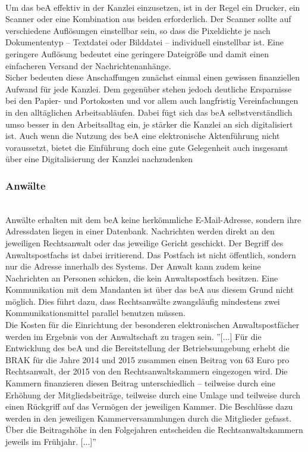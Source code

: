 \\
Um das beA effektiv in der Kanzlei einzusetzen, ist in der Regel ein Drucker, ein Scanner oder eine Kombination aus beiden erforderlich. Der Scanner sollte auf verschiedene Auflösungen einstellbar sein, so dass die Pixeldichte je nach Dokumententyp – Textdatei oder Bilddatei – individuell einstellbar ist. Eine geringere Auflösung bedeutet eine geringere Dateigröße und damit einen einfacheren Versand der Nachrichtenanhänge. \\
Sicher bedeuten diese Anschaffungen zunächst einmal einen gewissen finanziellen Aufwand für jede Kanzlei. Dem gegenüber stehen jedoch deutliche Ersparnisse bei den Papier- und Portokosten und vor allem auch langfristig Vereinfachungen in den alltäglichen Arbeitsabläufen. Dabei fügt sich das beA selbstverständlich umso besser in den Arbeitsalltag ein, je stärker die Kanzlei an sich digitalisiert ist. Auch wenn die Nutzung des beA eine elektronische Aktenführung nicht voraussetzt, bietet die Einführung doch eine gute Gelegenheit auch insgesamt über eine Digitalisierung der Kanzlei nachzudenken

\subsubsection{Anwälte}\hspace*{\fill} \\
Anwälte erhalten mit dem beA keine herkömmliche E-Mail-Adresse, sondern ihre Adressdaten liegen in einer Datenbank. Nachrichten werden direkt an den jeweiligen Rechtsanwalt oder das jeweilige Gericht geschickt.
Der Begriff des Anwaltspostfachs ist dabei irritierend. Das Postfach ist nicht öffentlich, sondern nur die Adresse innerhalb des Systems. Der Anwalt kann zudem keine Nachrichten an Personen schicken, die kein Anwaltspostfach besitzen. Eine Kommunikation mit dem Mandanten ist über das beA aus diesem Grund nicht möglich. Dies führt dazu, dass Rechtsanwälte zwangsläufig mindestens zwei Kommunikationsmittel parallel benutzen müssen. \\
Die Kosten für die Einrichtung der besonderen elektronischen Anwaltspostfächer werden im Ergebnis von der Anwaltschaft zu tragen sein. ''[...] Für die Entwicklung des beA und die Bereitstellung der Betriebsumgebung erhebt die BRAK für die Jahre 2014 und 2015 zusammen einen Beitrag von 63 Euro pro Rechtsanwalt, der 2015 von den Rechtsanwaltskammern eingezogen wird. Die Kammern finanzieren diesen Beitrag unterschiedlich – teilweise durch eine Erhöhung der Mitgliedsbeiträge, teilweise durch eine Umlage und teilweise durch einen Rückgriff auf das Vermögen der jeweiligen Kammer. Die Beschlüsse dazu werden in den jeweiligen Kammerversammlungen durch die Mitglieder gefasst. Über die Beitragshöhe in den Folgejahren entscheiden die Rechtsanwaltskammern jeweils im Frühjahr. [...]'' \cite{bea:bea:brak}

